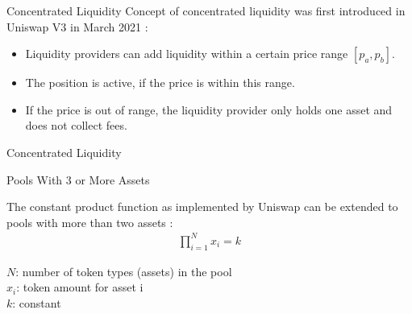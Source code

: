 \documentclass[]{beamer}
\begin{document}
\begin{frame}{Concentrated Liquidity}
	Concept of concentrated liquidity was first introduced in Uniswap V3 in March 2021 \cite{UNIV3}:
	\begin{itemize}
		\item<2-> Liquidity providers can add liquidity within a certain price range $[p_a, p_b]$.
		\item<3-> The position is active, if the price is within this range. %
		\item<4-> If the price is out of range, the liquidity provider only holds one asset and does not collect fees.
	\end{itemize}
	\vspace{0.5cm}
\end{frame}


\begin{frame}{Concentrated Liquidity}
	\begin{figure}[h!]
		\begin{center}
			
		\end{center}
	\end{figure}	
\end{frame}


\begin{frame}{Pools With 3 or More Assets}

The constant product function as implemented by Uniswap can be extended to pools with more than two assets \cite{BAL}:
		\begin{align*}
			\prod_{i=1}^N x_i= k
		\end{align*}
		
$N$: number of token types (assets) in the pool\\
$x_i$: token amount for asset i\\
$k$: constant

\end{frame}
\end{document}
